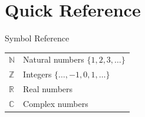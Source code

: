 \documentclass[a4paper, fontsize=7pt]{scrartcl}
\def\N{\mathbb{N}}  %
\def\Z{\mathbb{Z}}  %
\def\R{\mathbb{R}}  %
\def\C{\mathbb{C}}  %
\renewcommand*{\arraystretch}{1.5}  %
\begin{document}
\section{Quick Reference}

\begin{mainbox}{Symbol Reference}
\renewcommand*{\arraystretch}{1.3}
\begin{center}
\begin{tabularx}{\linewidth}{lX}
$\N$ & Natural numbers $\{1, 2, 3, \ldots\}$ \\
$\Z$ & Integers $\{\ldots, -1, 0, 1, \ldots\}$ \\
$\R$ & Real numbers \\
$\C$ & Complex numbers \\
\end{tabularx}
\end{center}
\end{mainbox}

%
%
%
\end{document}
